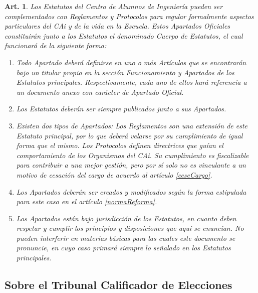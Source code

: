 \documentclass[letterpaper,11pt]{article}
\theoremstyle{plain}
\newtheorem{art}{Art.} %
\newcommand{\aref}[1]{\hyperref[#1]{\ref*{#1}}}
\begin{document}
		\begin{art}\label{definicionApartados}
			Los Estatutos del Centro de Alumnos de Ingeniería pueden ser complementados con Reglamentos y Protocolos para regular formalmente aspectos particulares del CAi y de la vida en la Escuela. Estos Apartados Oficiales constituirán junto a los Estatutos el denominado Cuerpo de Estatutos, el cual funcionará de la siguiente forma:
			\begin{enumerate}
				\item Todo Apartado deberá definirse en uno o más Artículos que se encontrarán bajo un titular propio en la sección Funcionamiento y Apartados de los Estatutos principales. Respectivamente, cada uno de ellos hará referencia a un documento anexo con carácter de Apartado Oficial.
				\item Los Estatutos deberán ser siempre publicados junto a sus Apartados.
				\item Existen dos tipos de Apartados: Los Reglamentos son una extensión de este Estatuto principal, por lo que deberá velarse por su cumplimiento de igual forma que el mismo. Los Protocolos definen directrices que guían el comportamiento de los Organismos del CAi. Su cumplimiento es fiscalizable para contribuir a una mejor gestión, pero por sí solo no es vinculante a un motivo de cesación del cargo de acuerdo al artículo \aref{ceseCargo}.
				\item Los Apartados deberán ser creados y modificados según la forma estipulada para este caso en el artículo \aref{normaReforma}.
				\item Los Apartados están bajo jurisdicción de los Estatutos, en cuanto deben respetar y cumplir los principios y disposiciones que aquí se enuncian. No pueden interferir en materias básicas para las cuales este documento se pronuncie, en cuyo caso primará siempre lo señalado en los Estatutos principales.
			\end{enumerate}
		\end{art}

		\subsection*{Sobre el Tribunal Calificador de Elecciones}
\end{document}

